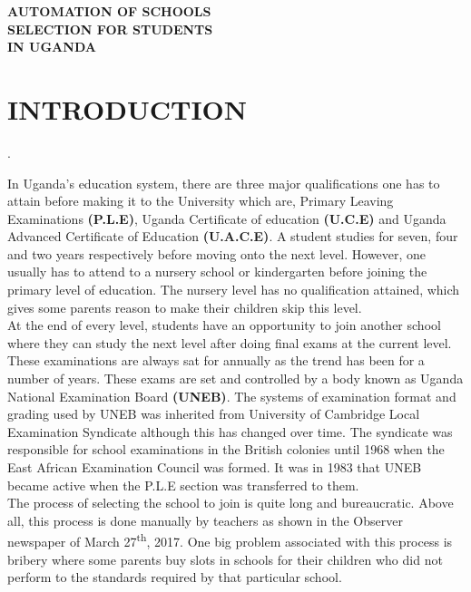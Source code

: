 \documentclass{article}
\begin{document}
\begin{center}
{\huge\textbf{AUTOMATION OF SCHOOLS \\ 
			SELECTION FOR STUDENTS \\ 
			IN UGANDA \\ }}

\end{center} 



\newpage

\section{INTRODUCTION}.

In Uganda’s education system, there are three major qualifications one has to attain before making it to the University which are, Primary Leaving Examinations \textbf{(P.L.E)}, Uganda Certificate of education \textbf{(U.C.E)} and Uganda Advanced Certificate of Education \textbf{(U.A.C.E)}. A student studies for seven, four and two years respectively before moving onto the next level. However, one usually has to attend to a nursery school or kindergarten before joining the primary level of education. The nursery level has no qualification attained, which gives some parents reason to make their children skip this level. \\

At the end of every level, students have an opportunity to join another school where they can study the next level after doing final exams at the current level. These examinations are always sat for annually as the trend has been for a number of years. These exams are set and controlled by a body known as Uganda National Examination Board \textbf{(UNEB)}. \cite{article} The systems of examination format and grading used by UNEB was inherited from University of Cambridge Local Examination Syndicate although this has changed over time. The syndicate was responsible for school examinations in the British colonies until 1968 when the East African Examination Council was formed. It was in 1983 that UNEB became active when the P.L.E section was transferred to them.  \\ 

The process of selecting the school to join is quite long and bureaucratic. Above all, this process is done manually by teachers as shown in the Observer newspaper of March 27\textsuperscript{th}, 2017.\cite{article2} One big problem associated with this process is bribery where some parents buy slots in schools for their children who did not perform to the standards required by that particular school. \\
\end{document}
